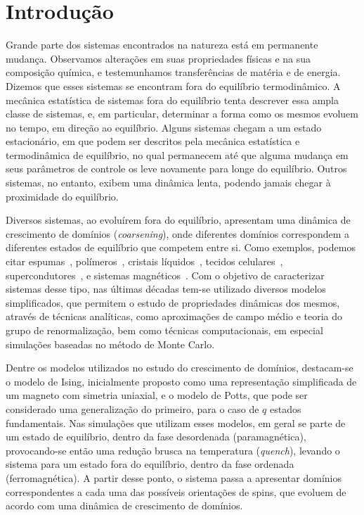 \chapter{Introdução} 
 \label{cap.Intro}

Grande parte dos sistemas encontrados na natureza está em permanente mudança. Observamos alterações em suas propriedades físicas e na sua composição química, e testemunhamos transferências de matéria e de energia. Dizemos que esses sistemas se encontram fora do equilíbrio termodinâmico. A mecânica estatística de sistemas fora do equilíbrio tenta descrever essa ampla classe de sistemas, e, em particular, determinar a forma como os mesmos evoluem no tempo, em direção ao equilíbrio. Alguns sistemas chegam a um estado estacionário, em que podem ser descritos pela mecânica estatística e termodinâmica de equilíbrio, no qual permanecem até que alguma mudança em seus parâmetros de controle os leve novamente para longe do equilíbrio. Outros sistemas, no entanto, exibem uma dinâmica lenta, podendo jamais chegar à proximidade do equilíbrio.

Diversos sistemas, ao evoluírem fora do equilíbrio, apresentam uma dinâmica de crescimento de domínios (\textit{coarsening}), onde diferentes domínios correspondem a diferentes estados de equilíbrio que competem entre si. Como exemplos, podemos citar espumas~\cite{Glazier1990}, polímeros~\cite{Willemse}, cristais líquidos~\cite{Sicilia2008}, tecidos celulares~\cite{Mombach1993}, supercondutores~\cite{Prozorov2008}, e sistemas magnéticos~\cite{Babcock1990,Jagla2004}. Com o objetivo de caracterizar sistemas desse tipo, nas últimas décadas tem-se utilizado diversos modelos simplificados, que permitem o estudo de propriedades dinâmicas dos mesmos, através de técnicas analíticas, como aproximações de campo médio e teoria do grupo de renormalização, bem como técnicas computacionais, em especial simulações baseadas no método de Monte Carlo.

Dentre os modelos utilizados no estudo do crescimento de domínios, destacam-se o modelo de Ising, inicialmente proposto como uma representação simplificada de um magneto com simetria uniaxial, e o modelo de Potts, que pode ser considerado uma generalização do primeiro, para o caso de $q$ estados fundamentais. Nas simulações que utilizam esses modelos, em geral se parte de um estado de equilíbrio, dentro da fase desordenada (paramagnética), provocando-se então uma redução brusca na temperatura (\textit{quench}), levando o sistema para um estado fora do equilíbrio, dentro da fase ordenada (ferromagnética). A partir desse ponto, o sistema passa a apresentar domínios correspondentes a cada uma das possíveis orientações de spins, que evoluem de acordo com uma dinâmica de crescimento de domínios.

